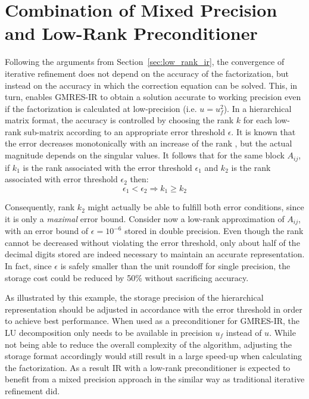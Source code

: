 \section{Combination of Mixed Precision and Low-Rank Preconditioner}
\label{sec:combinded_ir}

Following the arguments from Section~\hyperref[sec:low_precision_ir]{\ref{sec:low_rank_ir}}, the convergence of iterative refinement does not depend on the accuracy of the factorization, but instead on the accuracy in which the correction equation can be solved. This, in turn, enables GMRES-IR to obtain a solution accurate to working precision even if the factorization is calculated at low-precision (i.e. $u=u_f^2$). In a hierarchical matrix format, the accuracy is controlled by choosing the rank $k$ for each low-rank sub-matrix according to an appropriate error threshold $\epsilon$. It is known that the error decreases monotonically with an increase of the rank \cite{eckart_approximation_1936}, but the actual magnitude depends on the singular values. It follows that for the same block $A_{ij}$, if $k_1$ is the rank associated with the error threshold $\epsilon_1$ and $k_2$ is the rank associated with error threshold $\epsilon_2$ then:
\begin{equation}
    \epsilon_1 < \epsilon_2 \Rightarrow k_1 \geq k_2
\end{equation}

\noindent Consequently, rank $k_2$ might actually be able to fulfill both error conditions, since it is only a \textit{maximal} error bound. Consider now a low-rank approximation of $A_{ij}$, with an error bound of $\epsilon=10^{-6}$ stored in double precision. Even though the rank cannot be decreased without violating the error threshold, only about half of the decimal digits stored are indeed necessary to maintain an accurate representation. In fact, since $\epsilon$ is safely smaller than the unit roundoff for single precision, the storage cost could be reduced by 50\% without sacrificing accuracy.

As illustrated by this example, the storage precision of the hierarchical representation should be adjusted in accordance with the error threshold in order to achieve best performance. When used as a preconditioner for GMRES-IR, the LU decomposition only needs to be available in precision $u_f$ instead of $u$. While not being able to reduce the overall complexity of the algorithm, adjusting the storage format accordingly would still result in a large speed-up when calculating the factorization. As a result IR with a low-rank preconditioner is expected to benefit from a mixed precision approach in the similar way as traditional iterative refinement did.

